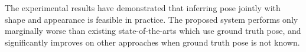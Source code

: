 The experimental results have demonstrated that inferring pose jointly with shape and appearance is feasible in practice. The proposed system performs only marginally worse than existing state-of-the-arts which use ground truth pose, and significantly improves on other approaches when ground truth pose is not known.  


